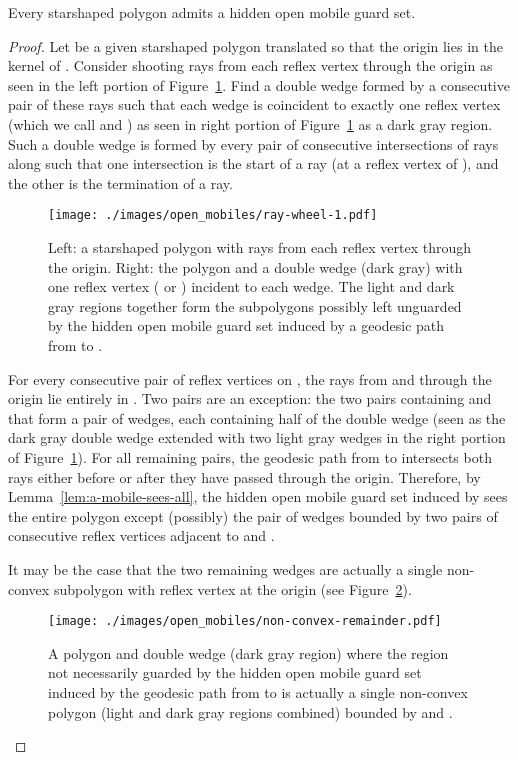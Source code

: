 \documentclass{cccg12}
\begin{document}
\begin{lemma}
\label{lem:open-mobile-ss}
Every starshaped polygon admits a hidden open mobile guard set.
\end{lemma}

\begin{proof}
Let  be a given starshaped polygon translated so that the origin lies in the kernel of .
Consider shooting rays from each reflex vertex through the origin as seen in the left portion of Figure~\ref{fig:ray-wheel-1}.
Find a double wedge  formed by a consecutive pair of these rays such that each wedge is coincident to exactly one reflex vertex (which we call  and ) as seen in right portion of Figure~\ref{fig:ray-wheel-1} as a dark gray region. 
Such a double wedge is formed by every pair of consecutive intersections of rays along  such that one intersection is the start of a ray (at a reflex vertex of ), and the other is the termination of a ray.

\begin{figure}[ht]
\centering
\texttt{[image: ./images/open\_mobiles/ray-wheel-1.pdf]}
\caption{Left: a starshaped polygon with rays from each reflex vertex through the origin.
Right: the polygon and a double wedge  (dark gray) with one reflex vertex ( or ) incident to each wedge.
The light and dark gray regions together form the subpolygons possibly left unguarded by the hidden open mobile guard set induced by a geodesic path from  to .}
\label{fig:ray-wheel-1}
\end{figure}

For every consecutive pair of reflex vertices  on , the rays from  and  through the origin lie entirely in .
Two pairs are an exception: the two pairs containing  and  that form a pair of wedges, each containing half of the double wedge  (seen as the dark gray double wedge extended with two light gray wedges in the right portion of Figure~\ref{fig:ray-wheel-1}). 
For all remaining pairs, the geodesic path from  to  intersects both rays either before or after they have passed through the origin.
Therefore, by Lemma~\ref{lem:a-mobile-sees-all}, the hidden open mobile guard set induced by  sees the entire polygon except (possibly) the pair of wedges bounded by two pairs of consecutive reflex vertices adjacent to  and . 

It may be the case that the two remaining wedges are actually a single non-convex subpolygon with reflex vertex at the origin (see Figure~\ref{fig:non-convex-remainder}).

\begin{figure}[ht]
\centering
\texttt{[image: ./images/open\_mobiles/non-convex-remainder.pdf]}
\caption{A polygon and double wedge  (dark gray region) where the region not necessarily guarded by the hidden open mobile guard set induced by the geodesic path from  to  is actually a single non-convex polygon (light and dark gray regions combined) bounded by  and .}
\label{fig:non-convex-remainder}
\end{figure}


\end{proof}
\end{document}
